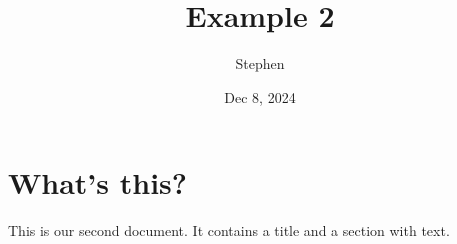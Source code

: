 \documentclass[a4paper, 11pt]{article}
\title{Example 2}
\author{Stephen}
\date{Dec 8, 2024}
\begin{document}
\maketitle
\section{What's this?}
This is our second document. It contains a title and a section with text.
\end{document}
